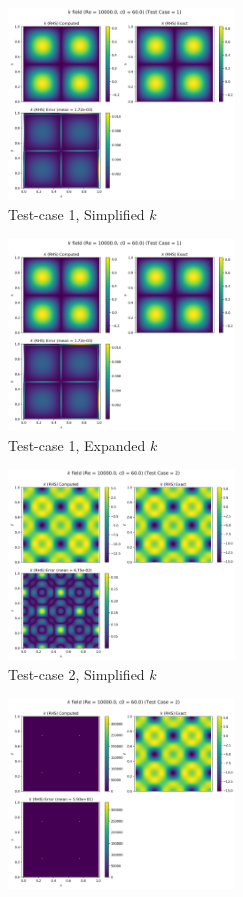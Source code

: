 \begin{figure}[htbp!]
  \begin{subfigure}{7cm}
    \centering\includegraphics[width=6cm]{Code-Figures/keps/keps-op-conv/c0_60_ke_expd_no_ketc_1_nx_150_re_10000/k_rhs.png}
    \caption{Test-case 1, Simplified $k$}
  \end{subfigure}
  \begin{subfigure}{7cm}
    \centering\includegraphics[width=6cm]{Code-Figures/keps/keps-op-conv/c0_60_ke_expd_yes_ketc_1_nx_150_re_10000/k_rhs.png}
    \caption{Test-case 1, Expanded $k$}
  \end{subfigure}
  \begin{subfigure}{7cm}
    \centering\includegraphics[width=6cm]{Code-Figures/keps/keps-op-conv/c0_60_ke_expd_no_ketc_2_nx_150_re_10000/k_rhs.png}
    \caption{Test-case 2, Simplified $k$}
  \end{subfigure}
  \begin{subfigure}{7cm}
    \centering\includegraphics[width=6cm]{Code-Figures/keps/keps-op-conv/c0_60_ke_expd_yes_ketc_2_nx_150_re_10000/k_rhs.png}

\end{subfigure}
\end{figure}
